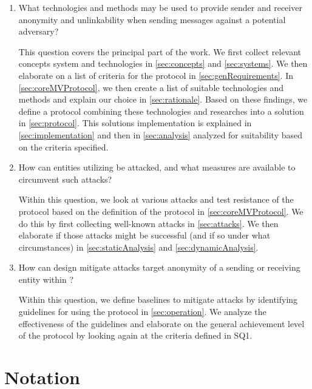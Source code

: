 \begin{enumerate}
	\item What technologies and methods may be used to provide sender and receiver anonymity and unlinkability when sending messages against a potential adversary? 
	
	      This question covers the principal part of the work. We first collect relevant concepts system and technologies in \cref{sec:concepts} and \ref{sec:systems}. We then elaborate on a list of criteria for the \MessageVortex protocol in \cref{sec:genRequirements}. In \cref{sec:coreMVProtocol}, we then create a list of suitable technologies and methods and explain our choice in \cref{sec:rationale}. Based on these findings, we define a protocol combining these technologies and researches into a solution in \cref{sec:protocol}. This solutions implementation is explained in \cref{sec:implementation} and then in \cref{sec:analysis} analyzed for suitability based on the criteria specified. 
	
	\item How can entities utilizing \MessageVortex be attacked, and what measures are available to circumvent such attacks? 
	
	      Within this question, we look at various attacks and test resistance of the protocol based on the definition of the protocol in \cref{sec:coreMVProtocol}. We do this by first collecting well-known attacks in \cref{sec:attacks}. We then elaborate if those attacks might be successful (and if so under what circumstances) in \cref{sec:staticAnalysis} and \cref{sec:dynamicAnalysis}.
	      
	\item How can design mitigate attacks target anonymity of a sending or receiving entity within \MessageVortex? 
	
          Within this question, we define baselines to mitigate attacks by identifying guidelines for using the protocol in \cref{sec:operation}. We analyze the effectiveness of the guidelines and elaborate on the general achievement level of the protocol by looking again at the criteria defined in SQ1. 

\end{enumerate}

\chapter{Notation}

